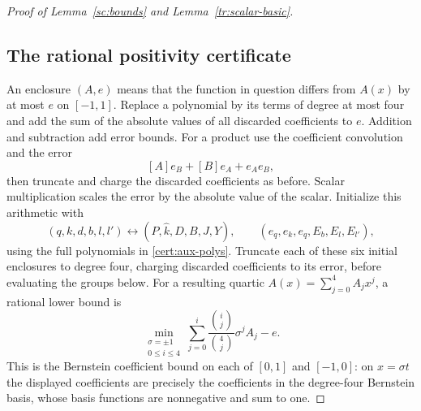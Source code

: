 \documentclass[11pt]{article}
\theoremstyle{definition}
\theoremstyle{remark}
\numberwithin{equation}{section}
\begin{document}
\begin{proof}[Proof of Lemma~\ref{sc:bounds} and Lemma~\ref{tr:scalar-basic}]
\subsection*{The rational positivity certificate}
An enclosure $(A,e)$ means that the function in question differs from
$A(x)$ by at most $e$ on $[-1,1]$. Replace a polynomial by its terms of
degree at most four and add the sum of the absolute values of all discarded
coefficients to $e$. Addition and subtraction add error bounds. For a
product use the coefficient convolution and the error
\begin{equation}\label{cert:product-error}
 [A]e_B+[B]e_A+e_Ae_B,
\end{equation}
then truncate and charge the discarded coefficients as before. Scalar
multiplication scales the error by the absolute value of the scalar.
Initialize this arithmetic with
\[
 (q,k,d,b,l,l')\longleftrightarrow
 (P,\widehat k,D,B,J,Y),\qquad
 (e_q,e_k,e_q,E_b,E_l,E_{l'}),
\]
using the full polynomials in \eqref{cert:aux-polys}. Truncate each of
these six initial enclosures to degree four, charging discarded coefficients
to its error, before evaluating the groups below.
For a resulting quartic $A(x)=\sum_{j=0}^4A_jx^j$, a rational lower bound is
\begin{equation}\label{cert:Bernstein}
 \min_{\substack{\sigma=\pm1\\0\le i\le4}}
       \sum_{j=0}^i\frac{\binom ij}{\binom4j}\sigma^jA_j-e.
\end{equation}
This is the Bernstein coefficient bound on each of $[0,1]$ and $[-1,0]$:
on $x=\sigma t$ the displayed coefficients are precisely the coefficients
in the degree-four Bernstein basis, whose basis functions are nonnegative
and sum to one.


\end{proof}
\end{document}
